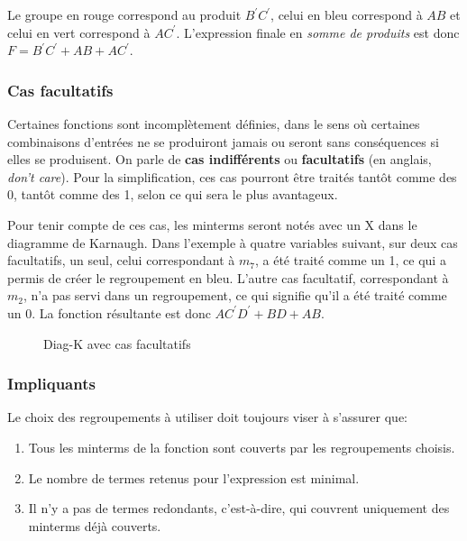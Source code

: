 \documentclass[11pt]{article}
\begin{document}
Le groupe en rouge correspond au produit \(B^\prime C^\prime\), celui
en bleu correspond à \(A B\) et celui en vert correspond à \(A
C^\prime\). L'expression finale en \emph{somme de produits} est donc \(F =
B^\prime C^\prime + A B + A C^\prime\).

\subsubsection{Cas facultatifs}
\label{sec:org0c03937}

Certaines fonctions sont incomplètement définies, dans le sens où
certaines combinaisons d'entrées ne se produiront jamais ou seront
sans conséquences si elles se produisent. On parle de \textbf{cas
indifférents} ou \textbf{facultatifs} (en anglais, \emph{don't care}). Pour la
simplification, ces cas pourront être traités tantôt comme des 0,
tantôt comme des 1, selon ce qui sera le plus avantageux.

Pour tenir compte de ces cas, les minterms seront notés avec un X dans
le diagramme de Karnaugh. Dans l'exemple à quatre variables suivant,
sur deux cas facultatifs, un seul, celui correspondant à \(m_{7}\), a
été traité comme un 1, ce qui a permis de créer le regroupement en
bleu. L'autre cas facultatif, correspondant à \(m_{2}\), n'a pas servi
dans un regroupement, ce qui signifie qu'il a été traité comme
un 0. La fonction résultante est donc \(A C^\prime D^\prime + BD + AB\).

\begin{figure}[htbp]
\centering

\caption{\label{fig:org8fc505d}Diag-K avec cas facultatifs}
\end{figure}


\subsubsection{Impliquants}
\label{sec:org185dc8f}

Le choix des regroupements à utiliser doit toujours viser à s'assurer que:
\begin{enumerate}
\item Tous les minterms de la fonction sont couverts par les regroupements choisis.
\item Le nombre de termes retenus pour l'expression est minimal.
\item Il n'y a pas de termes redondants, c'est-à-dire, qui couvrent
uniquement des minterms déjà couverts.
\end{enumerate}
\end{document}
